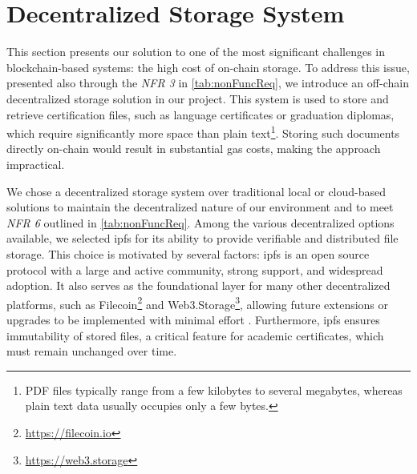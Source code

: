 \section{Decentralized Storage System}
\label{sec:decStorageDesgn}
This section presents our solution to one of the most significant challenges in blockchain-based systems: the high cost of on-chain storage. To address this issue, presented also through the \textit{NFR 3} in \cref{tab:nonFuncReq}, we introduce an off-chain decentralized storage solution in our project. This system is used to store and retrieve certification files, such as language certificates or graduation diplomas, which require significantly more space than plain text\footnote{PDF files typically range from a few kilobytes to several megabytes, whereas plain text data usually occupies only a few bytes.}. Storing such documents directly on-chain would result in substantial gas costs, making the approach impractical. 

We chose a decentralized storage system over traditional local or cloud-based solutions to maintain the decentralized nature of our environment and to meet \textit{NFR 6} outlined in \cref{tab:nonFuncReq}. Among the various decentralized options available, we selected \acrfull{ipfs} for its ability to provide verifiable and distributed file storage. This choice is motivated by several factors: \acrshort{ipfs} is an open source protocol with a large and active community, strong support, and widespread adoption. It also serves as the foundational layer for many other decentralized platforms, such as Filecoin\footnote{\url{https://filecoin.io}} and Web3.Storage\footnote{\url{https://web3.storage}}, allowing future extensions or upgrades to be implemented with minimal effort \cite{erikflorian2022ipfsandfrineds}. Furthermore, \acrshort{ipfs} ensures immutability of stored files, a critical feature for academic certificates, which must remain unchanged over time.


